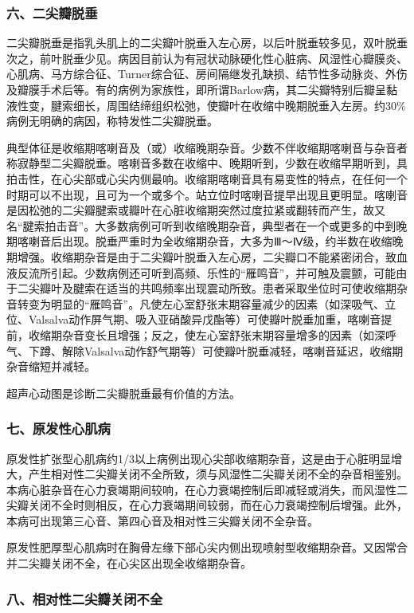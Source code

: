 \subsubsection{六、二尖瓣脱垂}

二尖瓣脱垂是指乳头肌上的二尖瓣叶脱垂入左心房，以后叶脱垂较多见，双叶脱垂次之，前叶脱垂少见。病因目前认为有冠状动脉硬化性心脏病、风湿性心瓣膜炎、心肌病、马方综合征、Turner综合征、房间隔继发孔缺损、结节性多动脉炎、外伤及瓣膜手术后等。有的病例为家族性，即所谓Barlow病，其二尖瓣特别后瓣呈黏液性变，腱索细长，周围结缔组织松弛，使瓣叶在收缩中晚期脱垂入左房。约30\%病例无明确的病因，称特发性二尖瓣脱垂。

典型体征是收缩期喀喇音及（或）收缩晚期杂音。少数不伴收缩期喀喇音与杂音者称寂静型二尖瓣脱垂。喀喇音多数在收缩中、晚期听到，少数在收缩早期听到，具拍击性，在心尖部或心尖内侧最响。收缩期喀喇音具有易变性的特点，在任何一个时期可以不出现，且可为一个或多个。站立位时喀喇音提早出现且更明显。喀喇音是因松弛的二尖瓣腱索或瓣叶在心脏收缩期突然过度拉紧或翻转而产生，故又名“腱索拍击音”。大多数病例可听到收缩晚期杂音，典型者在一个或更多的中到晚期喀喇音后出现。脱垂严重时为全收缩期杂音，大多为Ⅲ～Ⅳ级，约半数在收缩晚期增强。收缩期杂音是由于二尖瓣叶脱垂入左心房，二尖瓣口不能紧密闭合，致血液反流所引起。少数病例还可听到高频、乐性的“雁鸣音”，并可触及震颤，可能由于二尖瓣叶及腱索在适当的共鸣频率出现震动所致。患者采取坐位时可使收缩期杂音转变为明显的“雁鸣音”。凡使左心室舒张末期容量减少的因素（如深吸气、立位、Valsalva动作屏气期、吸入亚硝酸异戊酯等）可使瓣叶脱垂加重，喀喇音提前，收缩期杂音变长且增强；反之，使左心室舒张末期容量增多的因素（如深呼气、下蹲、解除Valsalva动作舒气期等）可使瓣叶脱垂减轻，喀喇音延迟，收缩期杂音缩短并减轻。

超声心动图是诊断二尖瓣脱垂最有价值的方法。

\subsubsection{七、原发性心肌病}

原发性扩张型心肌病约1/3以上病例出现心尖部收缩期杂音，这是由于心脏明显增大，产生相对性二尖瓣关闭不全所致，须与风湿性二尖瓣关闭不全的杂音相鉴别。本病心脏杂音在心力衰竭期间较响，在心力衰竭控制后即减轻或消失，而风湿性二尖瓣关闭不全时则相反，在心力衰竭期间较弱，而在心力衰竭控制后增强。此外，本病可出现第三心音、第四心音及相对性三尖瓣关闭不全杂音。

原发性肥厚型心肌病时在胸骨左缘下部心尖内侧出现喷射型收缩期杂音。又因常合并二尖瓣关闭不全，在心尖区出现全收缩期杂音。

\subsubsection{八、相对性二尖瓣关闭不全}

